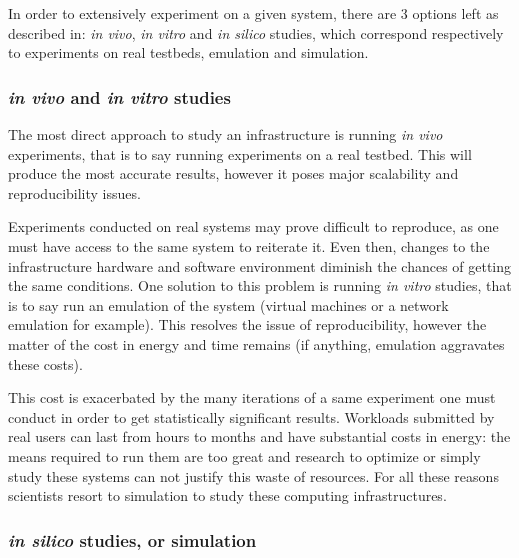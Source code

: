 In order to extensively experiment on a given system, there are 3 options left
as described in\cite{legrand2015scheduling}: \textit{in vivo}, \textit{in
vitro} and \textit{in silico} studies, which correspond respectively to
experiments on real testbeds, emulation and simulation.  


\subsubsection{\textit{in vivo} and \textit{in vitro} studies}

The most direct approach to study an infrastructure is running \textit{in vivo}
experiments, that is to say running experiments on a real testbed. This will
produce the most accurate results, however it poses major scalability and
reproducibility issues.

Experiments conducted on real systems may prove difficult to reproduce, as one
must have access to the same system to reiterate it. Even then, changes to the
infrastructure hardware and software environment diminish the chances of
getting the same conditions. One solution to this problem is running \textit{in
vitro} studies, that is to say run an emulation of the system (virtual machines
or a network emulation for example). This resolves the issue of
reproducibility, however the matter of the cost in energy and time remains (if
anything, emulation aggravates these costs).

This cost is exacerbated by the many iterations of a same experiment one must
conduct in order to get statistically significant results. Workloads submitted
by real users can last from hours to months and have substantial costs in
energy: the means required to run them are too great and research to optimize
or simply study these systems can not justify this waste of resources. For all
these reasons scientists resort to simulation to study these computing
infrastructures.

\subsubsection{\textit{in silico} studies, or simulation}

